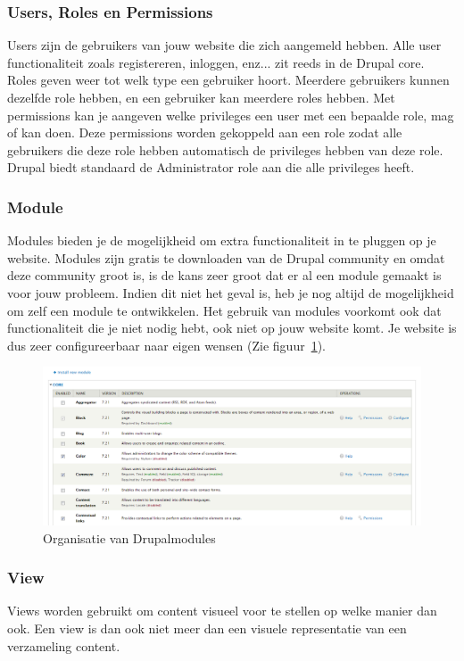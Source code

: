 \subsubsection{Users, Roles en Permissions}
Users zijn de gebruikers van jouw website die zich aangemeld hebben. Alle user functionaliteit zoals registereren, inloggen, enz... zit reeds in de Drupal core. Roles geven weer tot welk type een gebruiker hoort. Meerdere gebruikers kunnen dezelfde role hebben, en een gebruiker kan meerdere roles hebben. Met permissions kan je aangeven welke privileges een user met een bepaalde role, mag of kan doen. Deze permissions worden gekoppeld aan een role zodat alle gebruikers die deze role hebben automatisch de privileges hebben van deze role. Drupal biedt standaard de Administrator role aan die alle privileges heeft.


\subsubsection{Module}
Modules bieden je de mogelijkheid om extra functionaliteit in te pluggen op je website. Modules zijn gratis te downloaden van de Drupal community en omdat deze community groot is, is de kans zeer groot dat er al een module gemaakt is voor jouw probleem. Indien dit niet het geval is, heb je nog altijd de mogelijkheid om zelf een module te ontwikkelen. Het gebruik van modules voorkomt ook dat functionaliteit die je niet nodig hebt, ook niet op jouw website komt. Je website is dus zeer configureerbaar naar eigen wensen (Zie figuur~\ref{fig:drupalOrganizeModules}).
\begin{figure}[h]
\includegraphics[width=1\textwidth]{fig/drupalOrganizeModules}
\caption{Organisatie van Drupalmodules}
\label{fig:drupalOrganizeModules}
\end{figure}

\subsubsection{View}
Views worden gebruikt om content visueel voor te stellen op welke manier dan ook. Een view is dan ook niet meer dan een visuele representatie van een verzameling content.

